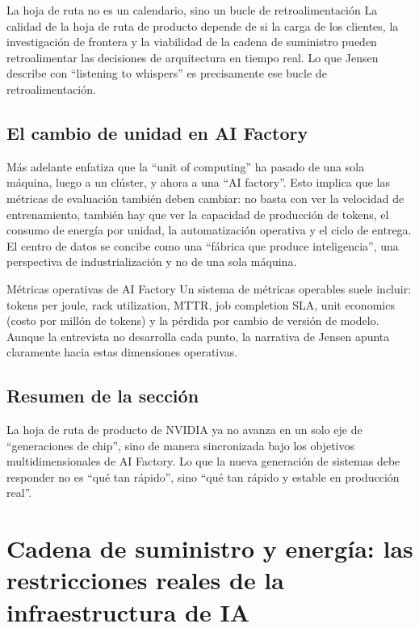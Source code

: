 \documentclass[a4paper]{article}
\begin{document}
\begin{importantbox}{La hoja de ruta no es un calendario, sino un bucle de retroalimentación}
La calidad de la hoja de ruta de producto depende de si la carga de los clientes, la investigación de frontera y la viabilidad de la cadena de suministro pueden retroalimentar las decisiones de arquitectura en tiempo real. Lo que Jensen describe con ``listening to whispers'' es precisamente ese bucle de retroalimentación.
\end{importantbox}

\subsection{El cambio de unidad en AI Factory}

Más adelante enfatiza que la ``unit of computing'' ha pasado de una sola máquina, luego a un clúster, y ahora a una ``AI factory''. Esto implica que las métricas de evaluación también deben cambiar: no basta con ver la velocidad de entrenamiento, también hay que ver la capacidad de producción de tokens, el consumo de energía por unidad, la automatización operativa y el ciclo de entrega. El centro de datos se concibe como una ``fábrica que produce inteligencia'', una perspectiva de industrialización y no de una sola máquina.

\begin{knowledgebox}{Métricas operativas de AI Factory}
Un sistema de métricas operables suele incluir: tokens per joule, rack utilization, MTTR, job completion SLA, unit economics (costo por millón de tokens) y la pérdida por cambio de versión de modelo. Aunque la entrevista no desarrolla cada punto, la narrativa de Jensen apunta claramente hacia estas dimensiones operativas.
\end{knowledgebox}

\subsection{Resumen de la sección}

La hoja de ruta de producto de NVIDIA ya no avanza en un solo eje de ``generaciones de chip'', sino de manera sincronizada bajo los objetivos multidimensionales de AI Factory. Lo que la nueva generación de sistemas debe responder no es ``qué tan rápido'', sino ``qué tan rápido y estable en producción real''.
\section{Cadena de suministro y energía: las restricciones reales de la infraestructura de IA}
\end{document}
